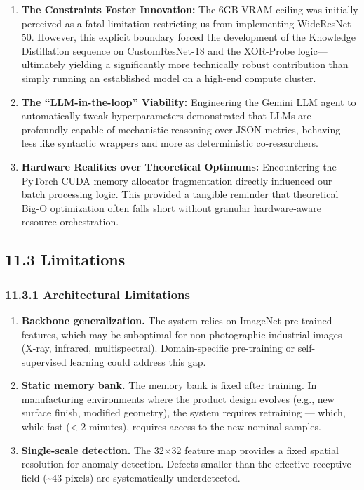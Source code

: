\begin{enumerate}
\def\labelenumi{\arabic{enumi}.}
\tightlist
\item
  \textbf{The Constraints Foster Innovation:} The 6GB VRAM ceiling was initially perceived as a fatal limitation restricting us from implementing WideResNet-50. However, this explicit boundary forced the development of the Knowledge Distillation sequence on CustomResNet-18 and the XOR-Probe logic---ultimately yielding a significantly more technically robust contribution than simply running an established model on a high-end compute cluster.
\item
  \textbf{The ``LLM-in-the-loop'' Viability:} Engineering the Gemini LLM agent to automatically tweak hyperparameters demonstrated that LLMs are profoundly capable of mechanistic reasoning over JSON metrics, behaving less like syntactic wrappers and more as deterministic co-researchers.
\item
  \textbf{Hardware Realities over Theoretical Optimums:} Encountering the PyTorch CUDA memory allocator fragmentation directly influenced our batch processing logic. This provided a tangible reminder that theoretical Big-O optimization often falls short without granular hardware-aware resource orchestration.
\end{enumerate}

\subsection{11.3 Limitations}\label{limitations}

\subsubsection{11.3.1 Architectural Limitations}\label{architectural-limitations}

\begin{enumerate}
\def\labelenumi{\arabic{enumi}.}
\item
  \textbf{Backbone generalization.} The system relies on ImageNet pre-trained features, which may be suboptimal for non-photographic industrial images (X-ray, infrared, multispectral). Domain-specific pre-training or self-supervised learning could address this gap.
\item
  \textbf{Static memory bank.} The memory bank is fixed after training. In manufacturing environments where the product design evolves (e.g., new surface finish, modified geometry), the system requires retraining --- which, while fast (\textless{} 2 minutes), requires access to the new nominal samples.
\item
  \textbf{Single-scale detection.} The 32×32 feature map provides a fixed spatial resolution for anomaly detection. Defects smaller than the effective receptive field (\textasciitilde43 pixels) are systematically underdetected.
\end{enumerate}

